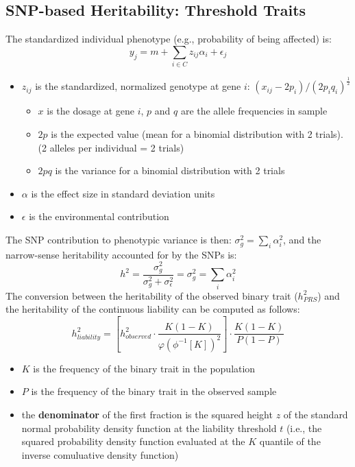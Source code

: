 \documentclass[10pt]{article}
\begin{document}
\subsection*{SNP-based Heritability: Threshold Traits}
The standardized individual phenotype (e.g., probability of being affected) is:
\[y_j = m + \sum_{i \in C} z_{ij} \alpha_i + \epsilon_j\]
\begin{itemize}
	\item $z_{ij}$ is the standardized, normalized genotype at gene $i$: $(x_{ij} - 2p_i) / (2p_i q_i)^{\frac{1}{2}}$
	\begin{itemize}
	    \item $x$ is the dosage at gene $i$, $p$ and $q$ are the allele frequencies in sample
	    \item $2p$ is the expected value (mean for a binomial distribution with 2 trials).  (2 alleles per individual = 2 trials)
	    \item $2pq$ is the variance for a binomial distribution with 2 trials
    \end{itemize}   
    \item $\alpha$ is the effect size in standard deviation units
    \item $\epsilon$ is the environmental contribution
\end{itemize}
The SNP contribution to phenotypic variance is then: $\sigma_g^2 = \sum_i \alpha_i^2$, and the narrow-sense heritability accounted for by the SNPs is:
\[h^2 = \frac{\sigma_g^2}{\sigma_g^2 + \sigma_\epsilon^2} = \sigma_g^2 = \sum_i \alpha_i^2\]
The conversion between the heritability of the observed binary trait ($h^2_{PRS}$) and the heritability of the continuous liability can be computed as follows:
\[h_{liability}^2 = [h_{observed}^2 \cdot \frac{K (1 - K)}{\varphi(\phi^{-1}[K])^2}] \cdot \frac{K(1 - K)}{P(1 - P)}\]
\begin{itemize}
	\item $K$ is the frequency of the binary trait in the population
	\item $P$ is the frequency of the binary trait in the observed sample
	\item the \textbf{denominator} of the first fraction is the squared height $z$ of the standard normal probability density function at the liability threshold $t$ (i.e., the squared probability density function evaluated at the $K$ quantile of the inverse comuluative density function)
\end{itemize}
\end{document}
